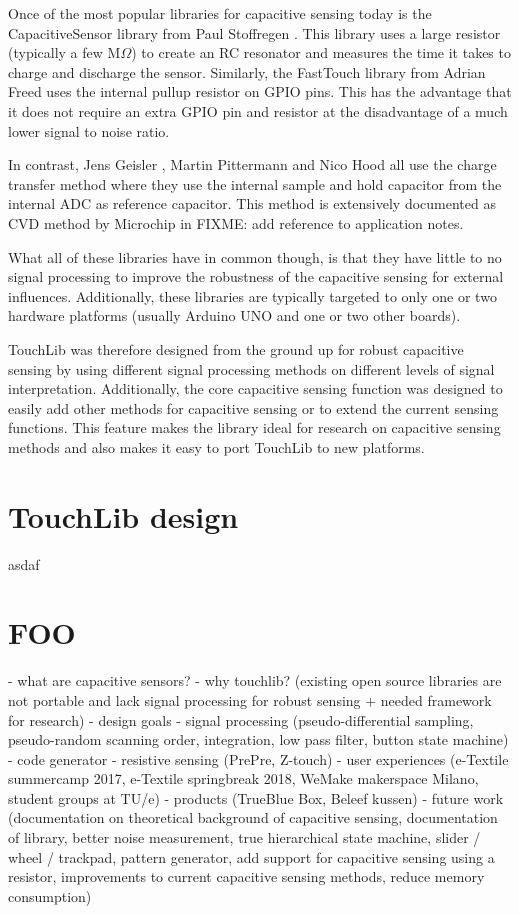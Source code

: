 \documentclass[format=sigchi, screen=true, review=true]{acmart}
\begin{document}
Once of the most popular libraries for capacitive sensing today is the
CapacitiveSensor library from Paul Stoffregen \cite{CapacitiveSensorWebsite}.
This library uses a large resistor (typically a few $\textrm{M}\Omega$) to
create an RC resonator and measures the time it takes to charge and discharge
the sensor. Similarly, the FastTouch library from Adrian Freed
\cite{FastTouchWebsite} uses the internal pullup resistor on GPIO pins. This
has the advantage that it does not require an extra GPIO pin and resistor at
the disadvantage of a much lower signal to noise ratio.

In contrast, Jens Geisler \cite{QTouchADCArduinoWebsite}, Martin Pittermann
\cite{ADCTouchWebsite} and Nico Hood \cite{AnalogTouch} all use the charge
transfer method where they use the internal sample and hold capacitor from the
internal ADC as reference capacitor. This method is extensively documented as
CVD method by Microchip in FIXME: add reference to application notes.

What all of these libraries have in common though, is that they have little to
no signal processing to improve the robustness of the capacitive sensing for
external influences. Additionally, these libraries are typically targeted to
only one or two hardware platforms (usually Arduino UNO and one or two other
boards).

TouchLib was therefore designed from the ground up for robust capacitive
sensing by using different signal processing methods on different levels of
signal interpretation. Additionally, the core capacitive sensing function was
designed to easily add other methods for capacitive sensing or to extend the
current sensing functions. This feature makes the library ideal for research on
capacitive sensing methods and also makes it easy to port TouchLib to new
platforms.

\section{TouchLib design}
asdaf

\section{FOO}
- what are capacitive sensors?
- why touchlib? (existing open source libraries are not portable and lack signal processing for robust sensing + needed framework for research)
- design goals
- signal processing (pseudo-differential sampling, pseudo-random scanning order, integration, low pass filter, button state machine)
- code generator
- resistive sensing (PrePre, Z-touch)
- user experiences (e-Textile summercamp 2017, e-Textile springbreak 2018, WeMake makerspace Milano, student groups at TU/e)
- products (TrueBlue Box, Beleef kussen)
- future work (documentation on theoretical background of capacitive sensing, documentation of library, better noise measurement, true hierarchical state machine, slider / wheel / trackpad, pattern generator, add support for capacitive sensing using a resistor, improvements to current capacitive sensing methods, reduce memory consumption)
\end{document}
